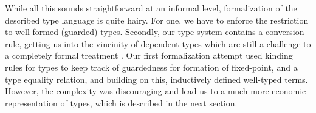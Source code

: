 While all this sounds straightforward at an informal level, formalization
of the described type language is quite hairy.  For one, we have to
enforce the restriction to well-formed (guarded) types.  Secondly, our
type system contains a conversion rule, getting us into the vincinity
of dependent types which are still a challenge to a completely formal
treatment \citep{mcBride:wgp10}.  Our first formalization attempt used
kinding rules for types to keep track of guardedness for formation of
fixed-point, and a type equality relation, and building on this,
inductively defined well-typed terms.  However, the complexity was
discouraging and lead us to a much more economic representation of
types, which is described in the next section.

